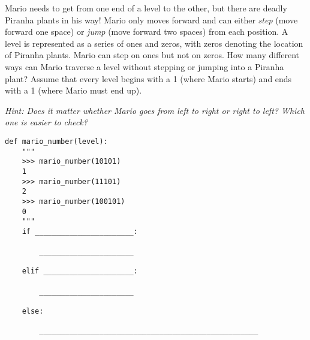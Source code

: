 \begin{blocksection}



\question Mario needs to get from one end of a level to the other, but there are deadly Piranha plants in his way! Mario only moves forward and can
either \emph{step} (move forward one space) or \emph{jump} (move forward two
spaces) from each position. A level is represented as a series of ones and zeros, with zeros denoting the location of Piranha plants. Mario can step on ones but not on zeros.  How many different ways can Mario traverse a level
without stepping or jumping into a Piranha plant? Assume that every level begins
with a 1 (where Mario starts) and ends with a 1 (where
Mario must end up).


\textit{Hint: Does it matter whether Mario goes from left to right or right to left? Which
one is easier to check?}

\begin{lstlisting}
def mario_number(level):
    """
    >>> mario_number(10101)
    1
    >>> mario_number(11101)
    2
    >>> mario_number(100101)
    0
    """
    if _______________________:

        ______________________

    elif _____________________:

        ______________________

    else:

        ___________________________________________________
\end{lstlisting}
\end{blocksection}

